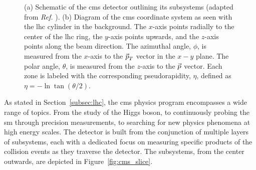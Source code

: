 \begin{figure}[h]
	\centering
	\caption[CMS detector and coordinate system]{(a) Schematic of the \acrshort{cms} detector outlining its subsystems (adapted from \textit{Ref.} \cite{CERN:39040}). (b) Diagram of the \acrshort{cms} coordinate system as seen with the \acrshort{lhc} cylinder in the background. The $x$-axis points radially to the center of the \acrshort{lhc} ring, the $y$-axis points upwards, and the $z$-axis points along the beam direction. The azimuthal angle, $\phi$, is measured from the $x$-axis to the $\vec{\mkern0mup}_T$ vector in the $x-y$ plane. The polar angle, $\theta$, is measured from the $z$-axis to the $\vec{\mkern0mup}$ vector. Each zone is labeled with the corresponding pseudorapidity, $\eta$, defined as $\eta = - \ln \tan (\theta / 2)$.}
	\label{fig:cms_images}
\end{figure}

As stated in Section~\ref{subsec:lhc}, the \acrshort{cms} physics program encompasses a wide range of topics. From the study of the Higgs boson, to continuously probing the \acrshort{sm} through precision measurements, to searching for new physics phenomena at high energy scales. The detector is built from the conjunction of multiple layers of subsystems, each with a dedicated focus on measuring specific products of the collision events as they traverse the detector. The subsystems, from the center outwards, are depicted in Figure~\ref{fig:cms_slice}.

